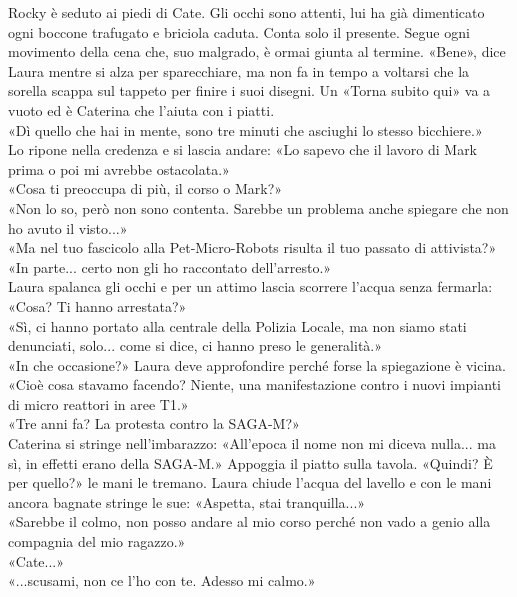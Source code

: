 \par\medskip
Rocky \`e seduto ai piedi di Cate. Gli occhi sono attenti, lui ha gi\`a dimenticato ogni boccone trafugato e briciola caduta. Conta solo il presente.  Segue ogni movimento della cena che, suo malgrado, \`e ormai giunta al termine.
«Bene», dice Laura mentre si alza per sparecchiare, ma non fa in tempo a voltarsi che la sorella  scappa sul tappeto per finire i suoi disegni. Un  «Torna subito qui» va a vuoto ed \`e Caterina che l'aiuta con i piatti.\\
«Dì quello che hai in mente, sono tre minuti che asciughi lo stesso bicchiere.»\\
Lo ripone nella credenza e si lascia andare: «Lo sapevo che il lavoro di Mark prima o poi mi avrebbe ostacolata.»\\
«Cosa ti preoccupa di pi\`u, il corso o Mark?»\\
«Non lo so, per\`o non sono contenta. Sarebbe un problema anche spiegare che non ho avuto il visto...»\\
«Ma nel tuo fascicolo alla Pet-Micro-Robots risulta il tuo passato di attivista?»\\
«In parte... certo non gli ho raccontato dell'arresto.»\\
Laura spalanca gli occhi e per un attimo lascia scorrere l'acqua senza fermarla: «Cosa? Ti hanno arrestata?»\\
«Sì, ci hanno portato alla centrale della Polizia Locale, ma non siamo stati denunciati, solo... come si dice, ci hanno preso le generalità.»\\
«In che occasione?» Laura deve approfondire perch\'e forse la spiegazione \`e vicina.\\
«Cio\`e cosa stavamo facendo? Niente, una manifestazione contro i nuovi impianti di micro reattori in aree T1.»\\
«Tre anni fa? La protesta contro la SAGA-M?»\\
Caterina si stringe nell'imbarazzo: «All'epoca il nome non mi diceva nulla... ma sì, in effetti erano della SAGA-M.» Appoggia il piatto sulla tavola. «Quindi? \`E per quello?» le mani le tremano.
Laura chiude l'acqua del lavello e con le mani ancora bagnate stringe le sue: «Aspetta, stai tranquilla...»\\
«Sarebbe il colmo, non posso andare al mio corso perch\'e non vado a genio alla compagnia del mio ragazzo.»\\
«Cate...»\\
«...scusami, non ce l'ho con te. Adesso mi calmo.»\\
